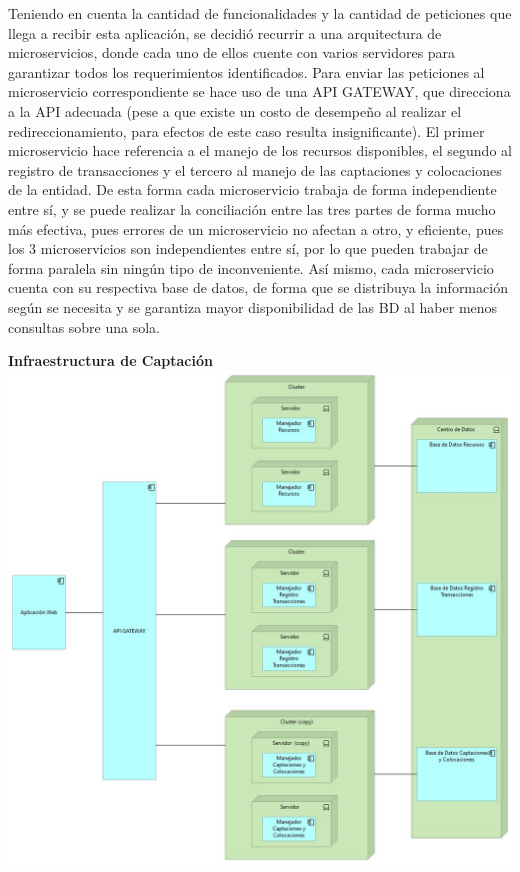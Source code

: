 \documentclass[a4paper]{article}
\begin{document}
Teniendo en cuenta la cantidad de funcionalidades y la cantidad de peticiones que llega a recibir esta aplicación, se decidió recurrir a una arquitectura de microservicios, donde cada uno de ellos cuente con varios servidores para garantizar todos los requerimientos identificados. Para enviar las peticiones al microservicio correspondiente se hace uso de una API GATEWAY, que direcciona a la API adecuada (pese a que existe un costo de desempeño al realizar el redireccionamiento, para efectos de este caso resulta insignificante). El primer microservicio hace referencia a el manejo de los recursos disponibles, el segundo al registro de transacciones y el tercero al manejo de las captaciones y colocaciones de la entidad. De esta forma cada microservicio trabaja de forma independiente entre sí, y se puede realizar la conciliación entre las tres partes de forma mucho más efectiva, pues errores de un microservicio no afectan a otro, y eficiente, pues los 3 microservicios son independientes entre sí, por lo que pueden trabajar de forma paralela sin ningún tipo de inconveniente. Así mismo, cada microservicio cuenta con su respectiva base de datos, de forma que se distribuya la información según se necesita y se garantiza mayor disponibilidad de las BD al haber menos consultas sobre una sola. 
\begin{center}
    \textbf{Infraestructura de Captación}
    \includegraphics[scale=0.45]{captacion.jpeg}        
\end{center}
\end{document}
